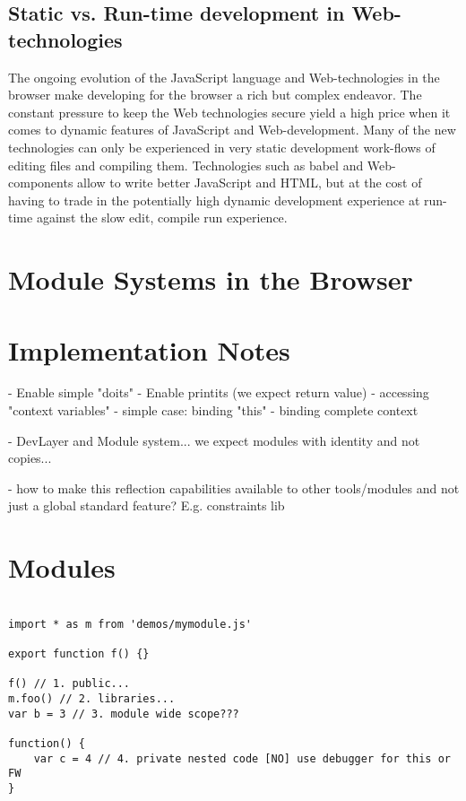 \subsection{Static vs. Run-time development in Web-technologies}

The ongoing evolution of the JavaScript language and Web-technologies in the browser make developing for the browser a rich but complex endeavor. The constant pressure to keep the Web technologies secure yield a high price when it comes to dynamic features of JavaScript and Web-development. Many of the new technologies can only be experienced in very static development work-flows of editing files and compiling them. Technologies such as babel and Web-components allow to write better JavaScript and HTML, but at the cost of having to trade in the potentially high dynamic development experience at run-time against the slow edit, compile run experience. 


\section{Module Systems in the Browser}

\section{Implementation Notes}

- Enable simple "doits" 
- Enable printits (we expect return value)
- accessing "context variables"
	- simple case: binding "this" 
	- binding complete context

- DevLayer and Module system... we expect modules with identity and not copies...

- how to make this reflection capabilities available to other tools/modules and not just a global standard feature? E.g. constraints lib




\section{Modules}

\begin{verbatim}

import * as m from 'demos/mymodule.js'

export function f() {} 

f() // 1. public...   
m.foo() // 2. libraries...
var b = 3 // 3. module wide scope???

function() {
	var c = 4 // 4. private nested code [NO] use debugger for this or FW
}
\end{verbatim}


